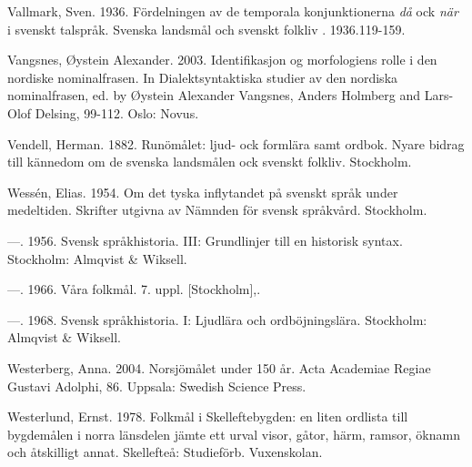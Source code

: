 Vallmark, Sven. 1936. Fördelningen av de temporala konjunktionerna \textit{då} ock \textit{när} i svenskt talspråk. Svenska landsmål och svenskt folkliv . 1936.119-159.


Vangsnes, Øystein Alexander. 2003. {\textquotesingle}Identifikasjon{\textquotesingle} og morfologiens rolle i den nordiske nominalfrasen. In Dialektsyntaktiska studier av den nordiska nominalfrasen, ed. by Øystein Alexander Vangsnes, Anders Holmberg and Lars-Olof Delsing, 99-112. Oslo: Novus.


Vendell, Herman. 1882. Runömålet: ljud- ock formlära samt ordbok. Nyare bidrag till kännedom om de svenska landsmålen ock svenskt folkliv. Stockholm.


Wessén, Elias. 1954. Om det tyska inflytandet på svenskt språk under medeltiden. Skrifter utgivna av Nämnden för svensk språkvård. Stockholm.


—. 1956. Svensk språkhistoria. III: Grundlinjer till en historisk syntax. Stockholm: Almqvist \& Wiksell.


—.  1966. Våra folkmål.  7. uppl. [Stockholm],.


—. 1968. Svensk språkhistoria.  I: Ljudlära och ordböjningslära. Stockholm: Almqvist \& Wiksell.


Westerberg, Anna. 2004. Norsjömålet under 150 år. Acta Academiae Regiae Gustavi Adolphi, 86. Uppsala: Swedish Science Press.


Westerlund, Ernst. 1978. Folkmål i Skelleftebygden: en liten ordlista till bygdemålen i norra länsdelen jämte ett urval visor, gåtor, härm, ramsor, öknamn och åtskilligt annat. Skellefteå: Studieförb. Vuxenskolan.


